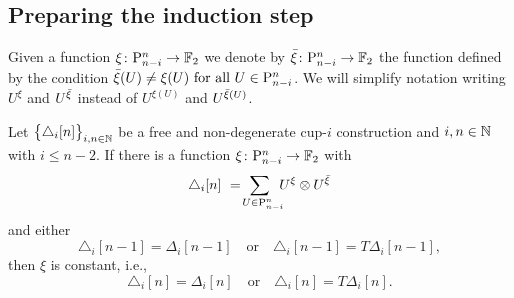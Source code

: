 \subsection{Preparing the induction step}

\begin{notation}
	Given a function $\xi \colon \mathrm{P}_{n-i}^n \to {\mathbb{F}_2}$ we denote by ${\bar{\xi}} \colon \mathrm{P}_{n-i}^n \to {\mathbb{F}_2}$ the function defined by the condition ${\bar{\xi}}(U) \neq \xi(U) \text{ for all } U \in \mathrm{P}_{n-i}^n$.
	We will simplify notation writing $U^\xi$ and $U^{{\bar{\xi}}}$ instead of $U^{\xi(U)}$ and $U^{{\bar{\xi}}(U)}$.
\end{notation}

\begin{lemma} \label{l:first nail}
	Let $\big\{ \triangle_i [n] \big\}_{i,n\in\mathbb{N}}$ be a free and non-degenerate cup-$i$ construction and $i,n \in \mathbb{N}$ with $i \leq n-2$.
	If there is a function $\xi \colon \mathrm{P}_{n-i}^n \to {\mathbb{F}_2}$ with
	\begin{equation} \label{e:assumed identity with xi and barxi}
	\triangle_i [n] \ = \!
	\sum_{U \in \mathrm{P}_{n-i}^n \kern-5pt} U^{\xi} \otimes U^{{\bar{\xi}}}
	\end{equation}
	and either
	\[
	\triangle_i [n-1] = \Delta_i [n-1]
	\quad \text{or} \quad
	\triangle_i [n-1] = T\Delta_i [n-1],
	\]
	then $\xi$ is constant, i.e.,
	\[
	\triangle_i [n] = \Delta_i [n]
	\quad \text{or} \quad
	\triangle_i [n] = T \Delta_i [n].
	\]
\end{lemma}

